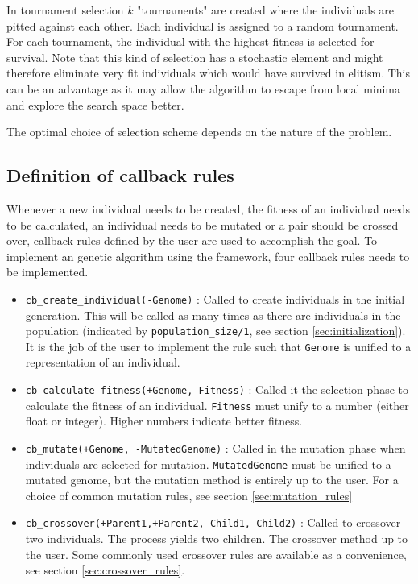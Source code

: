 \documentclass{article}
\begin{document}
In tournament selection $k$ "tournaments" are created where the individuals are pitted against each other. Each individual is assigned to a random tournament. For each tournament, the individual with the highest fitness is selected for survival. Note that this kind of selection has a stochastic element and might therefore eliminate very fit individuals which would have survived in elitism. This can be an advantage as it may allow the algorithm to escape from local minima and explore the search space better. 

The optimal choice of selection scheme depends on the nature of the problem.

\subsection{Definition of callback rules}

Whenever a new individual needs to be created, the fitness of an individual needs to be calculated, an individual needs to be mutated or a pair should be crossed over, callback rules defined by the user are used to accomplish the goal.
To implement an genetic algorithm using the framework, four callback rules needs to be implemented.

\begin{itemize}
\item \verb|cb_create_individual(-Genome)| : Called to create individuals in the initial generation. This will be called as many times as there are individuals in the population (indicated by \verb|population_size/1|, see section \ref{sec:initialization}). It is the job of the user to implement the rule such that \verb|Genome| is unified to a representation of an individual.
\item \verb|cb_calculate_fitness(+Genome,-Fitness)| : Called it the selection phase to calculate the fitness of an individual. \verb|Fitness| must unify to a number (either float or integer). Higher numbers indicate better fitness. 
\item \verb|cb_mutate(+Genome, -MutatedGenome)| : Called in the mutation phase when individuals are selected for mutation. \verb|MutatedGenome| must be unified to a mutated genome, but the mutation method is entirely up to the user. For a choice of common mutation rules, see section \ref{sec:mutation_rules}
\item \verb|cb_crossover(+Parent1,+Parent2,-Child1,-Child2)| : Called to crossover two individuals. The process yields two children. The crossover method up to the user. Some commonly used crossover rules are available as a convenience, see section \ref{sec:crossover_rules}.
\end{itemize}
\end{document}
